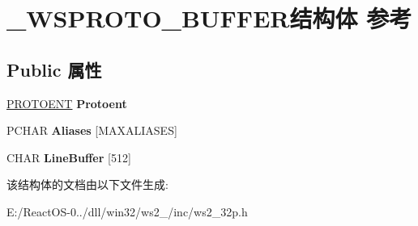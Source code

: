 \hypertarget{struct___w_s_p_r_o_t_o___b_u_f_f_e_r}{}\section{\+\_\+\+W\+S\+P\+R\+O\+T\+O\+\_\+\+B\+U\+F\+F\+E\+R结构体 参考}
\label{struct___w_s_p_r_o_t_o___b_u_f_f_e_r}
\subsection*{Public 属性}
\begin{DoxyCompactItemize}
\item 
\mbox{\label{struct___w_s_p_r_o_t_o___b_u_f_f_e_r_a3567dd36e148f2a3044c48ba0ca7ae46}} 
\hyperlink{structprotoent}{P\+R\+O\+T\+O\+E\+NT} {\bfseries Protoent}
\item 
\mbox{\label{struct___w_s_p_r_o_t_o___b_u_f_f_e_r_a0296a9c62d2d1e88270cd3c4fd52f03a}} 
P\+C\+H\+AR {\bfseries Aliases} \mbox{[}M\+A\+X\+A\+L\+I\+A\+S\+ES\mbox{]}
\item 
\mbox{\label{struct___w_s_p_r_o_t_o___b_u_f_f_e_r_a3b05d349ea8bf789dd4bf2973f1cf7cc}} 
C\+H\+AR {\bfseries Line\+Buffer} \mbox{[}512\mbox{]}
\end{DoxyCompactItemize}


该结构体的文档由以下文件生成\+:\begin{DoxyCompactItemize}
\item 
E\+:/\+React\+O\+S-\/0../dll/win32/ws2\+\_/inc/ws2\+\_\+32p.\+h\end{DoxyCompactItemize}
